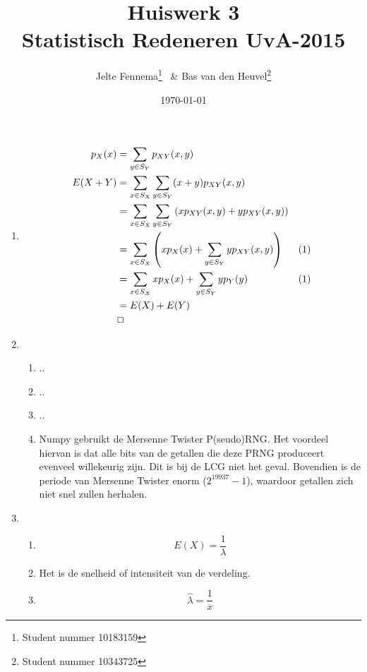 \documentclass{article}
\title{Huiswerk 3\\ \large{Statistisch Redeneren UvA-2015}}
\author{Jelte Fennema\thanks{Student nummer 10183159} ~\& Bas van den
Heuvel\thanks{Student nummer 10343725}}
\date{\today}
\begin{document}
\maketitle

\begin{enumerate}
    \item
        \begin{align}
            p_X(x) &= \sum_{y \in S_Y} p_{XY}(x, y) \\
            E(X+Y) &= \sum_{x \in S_X} \sum_{y \in S_Y} (x+y)p_{XY}(x,y) \notag \\
                   &= \sum_{x \in S_X} \sum_{y \in S_Y} \left(xp_{XY}(x, y)
            +yp_{XY}(x, y) \right) \notag \\
                   &= \sum_{x \in S_X} \left(xp_X(x) + \sum_{y \in S_Y}
            yp_{XY}(x,y)\right)
            & (1) \notag \\
                   &= \sum_{x \in S_X} xp_X(x) + \sum_{y \in S_Y} yp_Y(y) & (1)
            \notag \\
                   &= E(X) + E(Y) \notag \\
                   & \Box \notag
        \end{align}

    \item
        \begin{enumerate}[1.]
            \item ..

            \item ..

            \item ..

            \item
                Numpy gebruikt de Mersenne Twister P(seudo)RNG. Het voordeel
                hiervan is dat alle bits van de getallen die deze PRNG
                produceert evenveel willekeurig zijn. Dit is bij de LCG niet het
                geval. Bovendien is de periode van Mersenne Twister enorm
                ($2^{19937}-1$), waardoor getallen zich niet snel zullen
                herhalen.

        \end{enumerate}

    \item
        \begin{enumerate}[1.]
            \item
                $$E(X) = \frac1{\lambda}$$

            \item
                Het is de snelheid of intensiteit van de verdeling.

            \item
                $$\widehat{\lambda}=\frac1{\overline{x}}$$

        \end{enumerate}

\end{enumerate}
\end{document}

